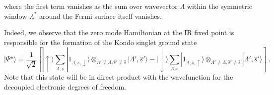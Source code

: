 \documentclass[aps,prb,preprint,groupedaddress]{revtex4-2}
\begin{document}
where the first term vanishes as the sum over wavevector $\Lambda$ within the symmetric window $\Lambda^{*}$ around the Fermi surface itself vanishes.
\par\noindent 
Indeed, we observe that the zero mode Hamiltonian at the IR fixed point is responsible for the formation of the Kondo singlet ground state
\begin{equation}
|\Psi*\rangle=\frac{1}{\sqrt{2}}\left[|\uparrow\rangle\sum_{\Lambda,\hat{s}}|1_{\Lambda,\hat{s},\downarrow}\rangle\otimes_{\Lambda'\neq\Lambda,\hat{s}'\neq \hat{s}}|\Lambda',\hat{s}'\rangle-|\downarrow\rangle\sum_{\Lambda,\hat{s}}|1_{\Lambda,\hat{s},\uparrow}\rangle\otimes_{\Lambda'\neq\Lambda,\hat{s}'\neq \hat{s}}|\Lambda',\hat{s}'\rangle\right]~.\label{eigState}
\end{equation}
Note that this state will be in direct product with the wavefunction for the decoupled electronic degrees of freedom.
\end{document}
